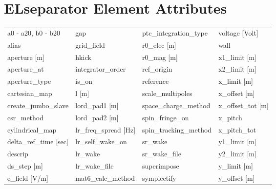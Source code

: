  \section{ELseparator Element Attributes}
 \label{s:list.elseparator}
 
 \begin{tabular}{llll} \toprule
a0 - a20, b0 - b20             & gap                            & ptc_integration_type           & voltage [Volt]                 \\
alias                          & grid_field                     & r0_elec [m]                    & wall                           \\
aperture [m]                   & hkick                          & r0_mag [m]                     & x1_limit [m]                   \\
aperture_at                    & integrator_order               & ref_origin                     & x2_limit [m]                   \\
aperture_type                  & is_on                          & reference                      & x_limit [m]                    \\
cartesian_map                  & l [m]                          & scale_multipoles               & x_offset [m]                   \\
create_jumbo_slave             & lord_pad1 [m]                  & space_charge_method            & x_offset_tot [m]               \\
csr_method                     & lord_pad2 [m]                  & spin_fringe_on                 & x_pitch                        \\
cylindrical_map                & lr_freq_spread [Hz]            & spin_tracking_method           & x_pitch_tot                    \\
delta_ref_time [sec]           & lr_self_wake_on                & sr_wake                        & y1_limit [m]                   \\
descrip                        & lr_wake                        & sr_wake_file                   & y2_limit [m]                   \\
ds_step [m]                    & lr_wake_file                   & superimpose                    & y_limit [m]                    \\
e_field [V/m]                  & mat6_calc_method               & symplectify                    & y_offset [m]                   \\

\end{tabular}
